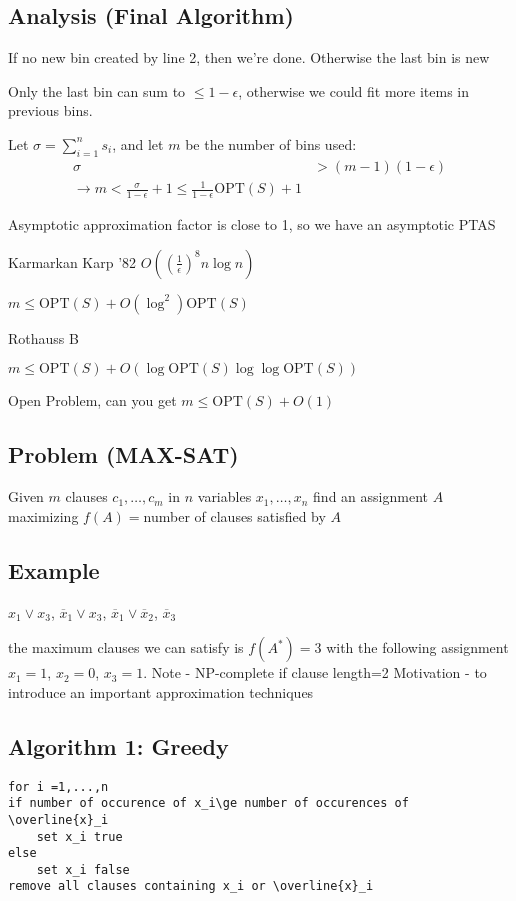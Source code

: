 \documentclass[english,12pt]{article}
\theoremstyle{plain}
\theoremstyle{definition}
\theoremstyle{definition} %
\begin{document}
\subsection{Analysis (Final Algorithm)}
If no new bin created by line 2, then we're done.  Otherwise the last bin is new

Only the last bin can sum to $\le 1-\epsilon$, otherwise we could fit more items in previous bins.

Let $\sigma=\sum_{i=1}^n s_i$, and let $m$ be the number of bins used:
\begin{align*}
\sigma &>(m-1)(1-\epsilon)\\
\rightarrow m < \frac{\sigma}{1-\epsilon} + 1
\le \frac{1}{1-\epsilon}\text{OPT}(S) + 1
\end{align*}

Asymptotic approximation factor is close to 1, so we have an asymptotic PTAS

Karmarkan Karp '82 $O\left(\left(\frac{1}{\epsilon}\right)^8 n\log n\right)$

$m\le \text{OPT}(S) + O(\log^2)\text{OPT}(S)$

Rothauss B

$m\le \text{OPT}(S) + O(\log \text{OPT}(S)\log\log \text{OPT}(S))$

Open Problem, can you get $m\le \text{OPT}(S) + O(1)$

\subsection{Problem (MAX-SAT)}
Given $m$ clauses $c_1,\ldots, c_m$ in $n$ variables $x_1,\ldots, x_n$ find an assignment $A$ maximizing $f(A)=$number of clauses satisfied by $A$

\subsection{Example}
$x_1\vee x_3$, $\overline{x}_1\vee x_3$, $\overline{x}_1\vee \overline{x}_2$, $\overline{x}_3$

the maximum clauses we can satisfy is $f(A^\ast)=3$ with the following assignment $x_1=1$, $x_2=0$, $x_3=1$.
Note - NP-complete if clause length=2
Motivation - to introduce an important approximation techniques

\subsection{Algorithm 1: Greedy}
\begin{verbatim}
for i =1,...,n
if number of occurence of x_i\ge number of occurences of \overline{x}_i
    set x_i true
else
    set x_i false
remove all clauses containing x_i or \overline{x}_i
\end{verbatim}
\end{document}
